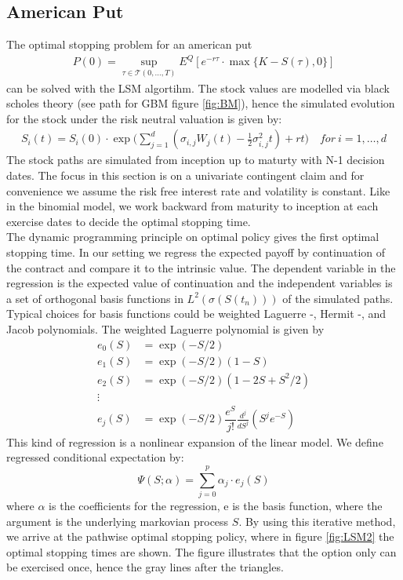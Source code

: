 \subsection{American Put}
The optimal stopping problem for an american put 
\begin{equation}\label{optimalStopPut}
\begin{split}
P(0) = \sup_{\tau \in \mathcal{T}(0,\ldots,T)} E^Q[ e^{-r \tau} \cdot \max\{K-S(\tau), 0 \}]
\end{split}
\end{equation}
can be solved with the LSM algortihm. The stock values are modelled via black scholes theory (see path for GBM figure \ref{fig:BM}), hence the simulated evolution for the stock under the risk neutral valuation is given by:
\begin{equation*}
\begin{split}
S_i(t)=S_i(0) \cdot \exp \bigg( \sum_{j=1}^{d}(\sigma_{i,j} W_j(t) -\frac{1}{2} \sigma_{i,j}^2 t) + rt \bigg) \quad  for \ i=1,\ldots,d
\end{split}
\end{equation*}
The stock paths are simulated from inception up to maturty with N-1 decision dates. The focus in this section is on a univariate contingent claim and for convenience we assume the risk free interest rate and volatility is constant. Like in the binomial model, we work backward from maturity to inception at each exercise dates to decide the optimal stopping time. \\

The dynamic programming principle on optimal policy gives the first optimal stopping time. In our setting we regress the expected payoff by continuation of the contract and compare it to the intrinsic value. The dependent variable in the regression is the expected value of continuation and the independent variables is a set of orthogonal basis functions in $L^2(\sigma(S(t_n)))$ of the simulated paths. Typical choices for basis functions could be weighted Laguerre -, Hermit -, and Jacob polynomials. The weighted Laguerre polynomial is given by
\begin{align*}
e_0(S) &= \exp(-S/2) \\
e_1(S) &= \exp(-S/2) (1-S) \\
e_2(S) &= \exp(-S/2) (1-2S+S^2/2) \\
\vdots \\
e_j(S) &= \exp(-S/2) \dfrac{e^S}{j!} \frac{d^j}{dS^j}(S^j e^{-S}) 
\end{align*} 
This kind of regression is a nonlinear expansion of the linear model. We define regressed conditional expectation by:
$$\Psi(S; \alpha)= \sum_{j=0}^p \alpha_j \cdot e_j(S) $$
where $\alpha$ is the coefficients for the regression, e is the basis function, where the argument is the underlying markovian process $S$. By using this iterative method, we arrive at the pathwise optimal stopping policy, where in figure \ref{fig:LSM2} the optimal stopping times are shown. The figure illustrates that the option only can be exercised once, hence the gray lines after the triangles.

